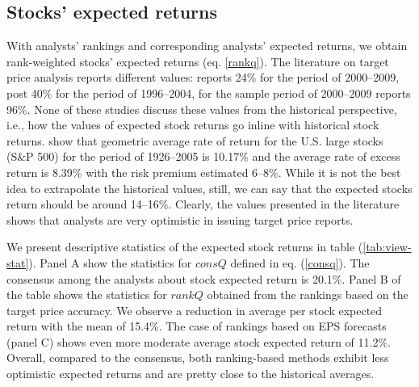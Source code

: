 \documentclass{article}\usepackage[]{graphicx}\usepackage[]{color}
\begin{document}
\subsection{Stocks' expected returns}
With analysts' rankings and corresponding analysts' expected returns, we obtain rank-weighted stocks' expected returns (eq. \ref{rankq}). The literature on target price analysis reports different values: \cite{bradshaw2002} reports 24\% for the period of 2000--2009, \cite{da2011} post 40\% for the period of 1996--2004, \cite{zhou2013} for the sample period of 2000--2009 reports 96\%. None of these studies discuss these values from the historical perspective, i.e., how the values of expected stock returns go inline with historical stock returns. \cite{bodie2009} show that geometric average rate of return for the U.S. large stocks (S\&P 500) for the period of 1926--2005 is 10.17\% and the average rate of excess return is 8.39\% with the risk premium estimated 6--8\%. While it is not the best idea to extrapolate the historical values, still, we can say that the expected stocks return should be around 14--16\%. Clearly, the values presented in the literature shows that analysts are very optimistic in issuing target price reports.

We present descriptive statistics of the expected stock returns in table (\ref{tab:view-stat}). Panel A show the statistics for $consQ$ defined in eq. (\ref{consq}). The consensus among the analysts about stock expected return is 20.1\%.  Panel B of the table shows the statistics for $rankQ$ obtained from the rankings based on the target price accuracy. We observe a reduction in average per stock expected return with the mean of 15.4\%. The case of rankings based on EPS forecasts (panel C) shows even more moderate average stock expected return of 11.2\%. Overall, compared to the consensus, both ranking-based methods exhibit less optimistic expected returns and are pretty close to the historical averages.
\end{document}
